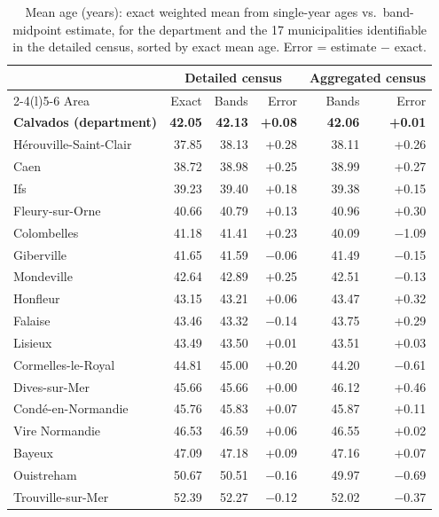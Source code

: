 \begin{table}[H]
  \centering
  \caption{Mean age (years): exact weighted mean from single-year ages vs.\ band-midpoint estimate, for the department
  and the 17 municipalities identifiable in the detailed census, sorted by exact mean age. Error = estimate $-$ exact.}
  \label{tab:mean-age-validation}
  \small
  \begin{tabular}{@{}lrrrrr@{}}
    \toprule
    & \multicolumn{3}{c}{Detailed census} & \multicolumn{2}{c}{Aggregated census} \\
    \cmidrule(lr){2-4}\cmidrule(l){5-6}
    Area & Exact & Bands & Error & Bands & Error \\
    \midrule
    \textbf{Calvados (department)} & \textbf{42.05} & \textbf{42.13} & \textbf{+0.08} & \textbf{42.06} & \textbf{+0.01} \\
    \midrule
    H\'erouville-Saint-Clair & 37.85 & 38.13 & +0.28 & 38.11 & +0.26 \\
    Caen & 38.72 & 38.98 & +0.25 & 38.99 & +0.27 \\
    Ifs & 39.23 & 39.40 & +0.18 & 39.38 & +0.15 \\
    Fleury-sur-Orne & 40.66 & 40.79 & +0.13 & 40.96 & +0.30 \\
    Colombelles & 41.18 & 41.41 & +0.23 & 40.09 & $-$1.09 \\
    Giberville & 41.65 & 41.59 & $-$0.06 & 41.49 & $-$0.15 \\
    Mondeville & 42.64 & 42.89 & +0.25 & 42.51 & $-$0.13 \\
    Honfleur & 43.15 & 43.21 & +0.06 & 43.47 & +0.32 \\
    Falaise & 43.46 & 43.32 & $-$0.14 & 43.75 & +0.29 \\
    Lisieux & 43.49 & 43.50 & +0.01 & 43.51 & +0.03 \\
    Cormelles-le-Royal & 44.81 & 45.00 & +0.20 & 44.20 & $-$0.61 \\
    Dives-sur-Mer & 45.66 & 45.66 & +0.00 & 46.12 & +0.46 \\
    Cond\'e-en-Normandie & 45.76 & 45.83 & +0.07 & 45.87 & +0.11 \\
    Vire Normandie & 46.53 & 46.59 & +0.06 & 46.55 & +0.02 \\
    Bayeux & 47.09 & 47.18 & +0.09 & 47.16 & +0.07 \\
    Ouistreham & 50.67 & 50.51 & $-$0.16 & 49.97 & $-$0.69 \\
    Trouville-sur-Mer & 52.39 & 52.27 & $-$0.12 & 52.02 & $-$0.37 \\
    \bottomrule
  \end{tabular}
\end{table}

